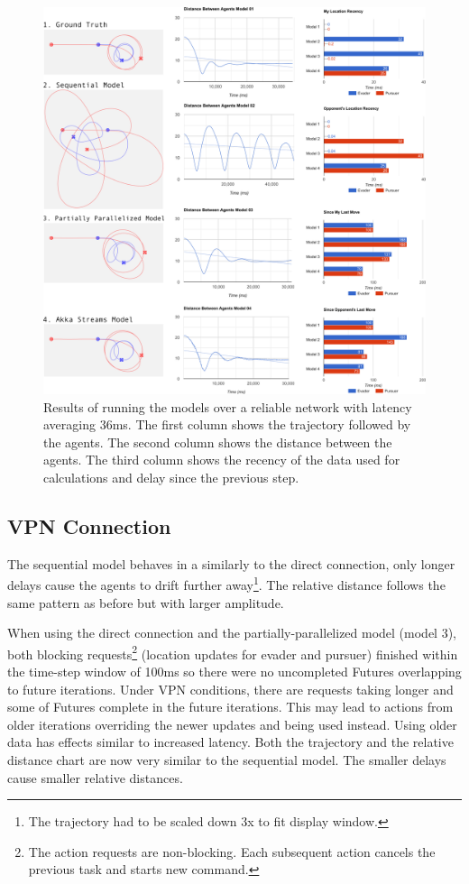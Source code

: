 \documentclass{article}
\begin{document}
\begin{figure}
	\centering
	\includegraphics[width=18.0cm]{charts-no-vpn}
	\caption{Results of running the models over a reliable network with latency averaging 36ms. The first column shows the trajectory followed by the agents. The second column shows the distance between the agents. The third column shows the recency of the data used for calculations and delay since the previous step.}\label{fig:charts-no-vpn}
\end{figure}


\subsection{VPN Connection} 
The sequential model behaves in a similarly to the direct connection, only longer delays cause the agents to drift further away\footnote{The trajectory had to be scaled down 3x to fit display window.}. The relative distance follows the same pattern as before but with larger amplitude. 

When using the direct connection and the partially-parallelized model (model 3), both blocking requests\footnote{The action requests are non-blocking. Each subsequent action cancels the previous task and starts new command.} (location updates for evader and pursuer) finished within the time-step window of 100ms so there were no uncompleted Futures overlapping to future iterations. Under VPN conditions, there are requests taking longer and some of Futures complete in the future iterations. This may lead to actions from older iterations overriding the newer updates and being used instead. Using older data has effects similar to increased latency. Both the trajectory and the relative distance chart are now very similar to the sequential model. The smaller delays cause smaller relative distances.
\end{document}
